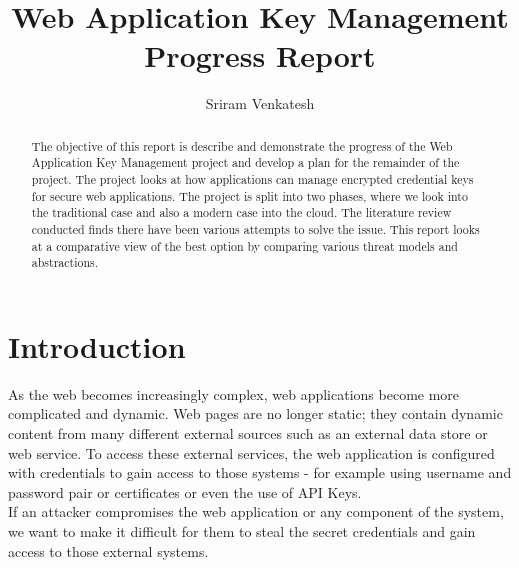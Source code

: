 \documentclass[11pt, a4paper, twoside, openany, notitlepage]{report}
\title{Web Application Key Management Progress Report}
\author{Sriram Venkatesh}
\date{}
\begin{document}
\frontmatter


\begin{abstract}
The objective of this report is describe and demonstrate the progress of the Web Application Key Management project and develop a plan for the remainder of the project. The project looks at how applications can manage encrypted credential keys for secure web applications. The project is split into two phases, where we look into the traditional case and also a modern case into the cloud. The literature review conducted finds there have been various attempts to solve the issue. This report looks at a comparative view of the best option by comparing various threat models and abstractions. 
\end{abstract}

\let\clearpage\relax
\maketitle




\mainmatter


\chapter{Introduction}
As the web becomes increasingly complex, web applications become more complicated and dynamic. Web pages are no longer static; they contain dynamic content from many different external sources such as an external data store or web service. To access these external services, the web application is configured with credentials to gain access to those systems - for example using username and password pair or certificates or even the use of API Keys. \\

If an attacker compromises the web application or any component of the system, we want to make it difficult for them to steal the secret credentials and gain access to those external systems. \\
\end{document}
